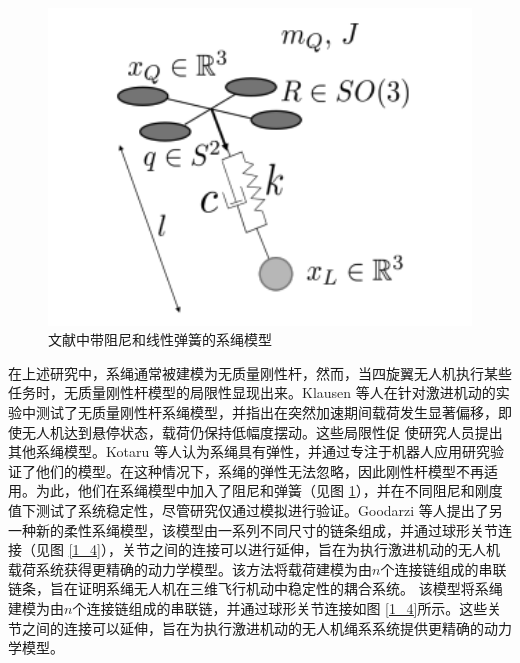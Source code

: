 \documentclass[lang=chs, degree=master, blindreview=true, winfonts=true]{yanputhesis}
\begin{document}
\begin{figure}[hbt!]
	\centering 
	\includegraphics[width=28pc]{picture/1_3.png} 
	\caption{文献中带阻尼和线性弹簧的系绳模型} \label{1_3}
\end{figure}
在上述研究中，系绳通常被建模为无质量刚性杆，然而，当四旋翼无人机执行某些任务时，无质量刚性杆模型的局限性显现出来\cite{castillo2019disturbance,estevez2021hybrid}。Klausen 等人\cite{klausen2017nonlinear}在针对激进机动的实验中测试了无质量刚性杆系绳模型，并指出在突然加速期间载荷发生显著偏移，即使无人机达到悬停状态，载荷仍保持低幅度摆动。这些局限性促 使研究人员提出其他系绳模型。Kotaru 等人\cite{kotaru2017dynamics}认为系绳具有弹性，并通过专注于机器人应用研究验证了他们的模型。在这种情况下，系绳的弹性无法忽略，因此刚性杆模型不再适用。为此，他们在系绳模型中加入了阻尼和弹簧（见图 \ref{1_3}），并在不同阻尼和刚度值下测试了系统稳定性，尽管研究仅通过模拟进行验证。Goodarzi 等人\cite{goodarzi2015geometric}提出了另一种新的柔性系绳模型，该模型由一系列不同尺寸的链条组成，并通过球形关节连接（见图 \ref{1_4}），关节之间的连接可以进行延伸，旨在为执行激进机动的无人机载荷系统获得更精确的动力学模型。该方法将载荷建模为由$n$个连接链组成的串联链条，旨在证明系绳无人机在三维飞行机动中稳定性的耦合系统。
该模型将系绳建模为由$n$个连接链组成的串联链，并通过球形关节连接如图 \ref{1_4}所示。这些关节之间的连接可以延伸，旨在为执行激进机动的无人机绳系系统提供更精确的动力学模型。
\end{document}
